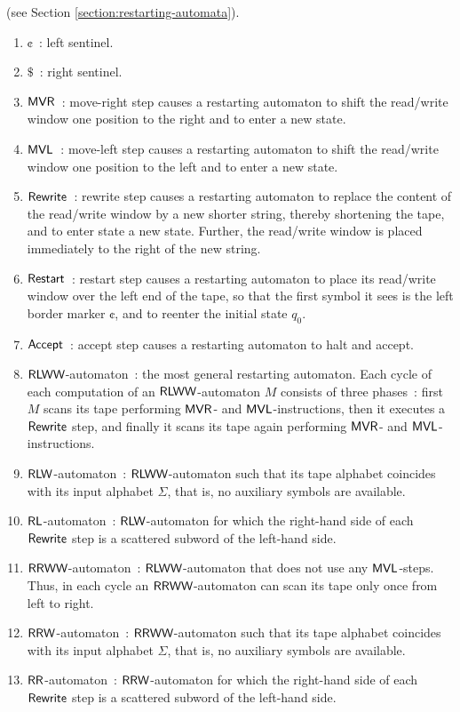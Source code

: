  (see Section \ref{section:restarting-automata}).

\begin{enumerate}[]
\item $\cent$\ : left sentinel.
\item $\$$\ : right sentinel.
\item $\textup{\sf MVR}$\ : move-right step causes a restarting automaton to shift the read/write window one position to the right and to enter a new state.
\item $\textup{\sf MVL}$\ : move-left step causes a restarting automaton to shift the read/write window one position to the left and to enter a new state.
\item $\textup{\sf Rewrite}$\ : rewrite step causes a restarting automaton to replace the content of the read/write window by a new shorter string, thereby shortening the tape, and to enter state a new state. Further, the read/write window is placed immediately to the right of the new string.
\item $\textup{\sf Restart}$\ : restart step causes a restarting automaton to place its read/write window over the left end of the tape, so that the first symbol it sees is the left border marker $\cent$, and to reenter the initial state $q_0$.
\item $\textup{\sf Accept}$\ : accept step causes a restarting automaton to halt and accept.
\item $\textup{\sf RLWW}$-automaton\ : the most general restarting automaton. Each cycle of each computation of an $\textup{\sf RLWW}$-automaton $M$ consists of three phases\ : first $M$ scans its tape performing $\textup{\sf MVR}$- and $\textup{\sf MVL}$-instructions, then it executes a $\textup{\sf Rewrite}$ step, and finally it scans its tape again performing $\textup{\sf MVR}$- and $\textup{\sf MVL}$-instructions.
\item $\textup{\sf RLW}$-automaton\ : $\textup{\sf RLWW}$-automaton such that its tape alphabet coincides with its input alphabet $\Sigma$, that is, no auxiliary symbols are available.
\item $\textup{\sf RL}$-automaton\ : $\textup{\sf RLW}$-automaton for which the right-hand side of each $\textup{\sf Rewrite}$ step is a scattered subword of the left-hand side.
\item $\textup{\sf RRWW}$-automaton\ : $\textup{\sf RLWW}$-automaton that does not use any $\textup{\sf MVL}$-steps. Thus, in each cycle an $\textup{\sf RRWW}$-automaton can scan its tape only once from left to right.
\item $\textup{\sf RRW}$-automaton\ : $\textup{\sf RRWW}$-automaton such that its tape alphabet coincides with its input alphabet $\Sigma$, that is, no auxiliary symbols are available.
\item $\textup{\sf RR}$-automaton\ : $\textup{\sf RRW}$-automaton for which the right-hand side of each $\textup{\sf Rewrite}$ step is a scattered subword of the left-hand side.

\end{enumerate}
